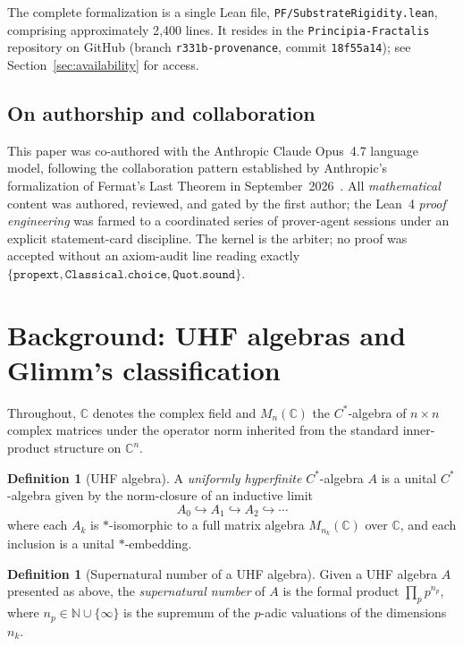 \documentclass[11pt,a4paper]{article}
\theoremstyle{plain}
\theoremstyle{definition}
\newtheorem{definition}[theorem]{Definition}
\begin{document}
The complete formalization is a single Lean file, \texttt{PF/SubstrateRigidity.lean}, comprising approximately 2{,}400 lines. It resides in the \texttt{Principia-Fractalis} repository on GitHub (branch \texttt{r331b-provenance}, commit \texttt{18f55a14}); see Section~\ref{sec:availability} for access.

\subsection*{On authorship and collaboration}
This paper was co-authored with the Anthropic Claude Opus~4.7 language model, following the collaboration pattern established by Anthropic's formalization of Fermat's Last Theorem in September~2026~\cite{anthropic_flt_2026}. All \emph{mathematical} content was authored, reviewed, and gated by the first author; the Lean~4 \emph{proof engineering} was farmed to a coordinated series of prover-agent sessions under an explicit statement-card discipline. The kernel is the arbiter; no proof was accepted without an axiom-audit line reading exactly $\{\texttt{propext}, \texttt{Classical.choice}, \texttt{Quot.sound}\}$.

\section{Background: UHF algebras and Glimm's classification}
\label{sec:background}

Throughout, $\mathbb{C}$ denotes the complex field and $M_n(\mathbb{C})$ the $C^{\ast}$-algebra of $n \times n$ complex matrices under the operator norm inherited from the standard inner-product structure on $\mathbb{C}^n$.

\begin{definition}[UHF algebra]
A \emph{uniformly hyperfinite} $C^{\ast}$-algebra $A$ is a unital $C^{\ast}$-algebra given by the norm-closure of an inductive limit
\[
A_0 \hookrightarrow A_1 \hookrightarrow A_2 \hookrightarrow \cdots
\]
where each $A_k$ is $\ast$-isomorphic to a full matrix algebra $M_{n_k}(\mathbb{C})$ over $\mathbb{C}$, and each inclusion is a unital $\ast$-embedding.
\end{definition}

\begin{definition}[Supernatural number of a UHF algebra]
Given a UHF algebra $A$ presented as above, the \emph{supernatural number} of $A$ is the formal product $\prod_p p^{n_p}$, where $n_p \in \mathbb{N} \cup \{\infty\}$ is the supremum of the $p$-adic valuations of the dimensions $n_k$.
\end{definition}
\end{document}
